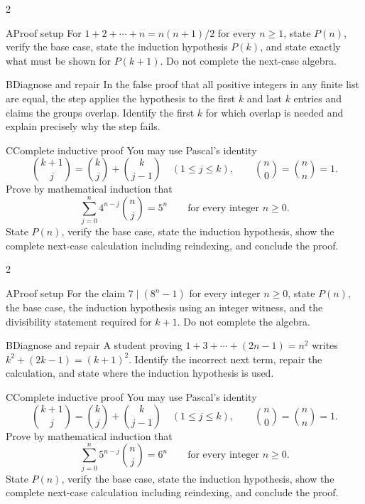 \documentclass[9pt]{extarticle}
\begin{document}
\CoreWorkArea
\FormBreak
{}
\begin{multicols}{2}
\begin{CompactCoreProblem}{A}{Proof setup}
For $1+2+\cdots+n=n(n+1)/2$ for every $n\ge1$, state $P(n)$, verify the base case, state the induction hypothesis $P(k)$, and state exactly what must be shown for $P(k+1)$. Do not complete the next-case algebra.
\end{CompactCoreProblem}
\begin{CompactCoreProblem}{B}{Diagnose and repair}
In the false proof that all positive integers in any finite list are equal, the step applies the hypothesis to the first $k$ and last $k$ entries and claims the groups overlap. Identify the first $k$ for which overlap is needed and explain precisely why the step fails.
\end{CompactCoreProblem}
\end{multicols}
\begin{CompactCoreProblem}{C}{Complete inductive proof}
You may use Pascal's identity
\[
\binom{k+1}{j}=\binom{k}{j}+\binom{k}{j-1}
\quad(1\le j\le k),\qquad
\binom{n}{0}=\binom{n}{n}=1.
\]
Prove by mathematical induction that
\[
\sum_{j=0}^{n} 4^{n-j}\binom{n}{j}=5^n\qquad\text{for every integer }n\ge0.
\]
State $P(n)$, verify the base case, state the induction hypothesis, show the complete next-case calculation including reindexing, and conclude the proof.
\end{CompactCoreProblem}
\CoreWorkArea
\FormBreak
{}
\begin{multicols}{2}
\begin{CompactCoreProblem}{A}{Proof setup}
For the claim $7\mid(8^n-1)$ for every integer $n\ge0$, state $P(n)$, the base case, the induction hypothesis using an integer witness, and the divisibility statement required for $k+1$. Do not complete the algebra.
\end{CompactCoreProblem}
\begin{CompactCoreProblem}{B}{Diagnose and repair}
A student proving $1+3+\cdots+(2n-1)=n^2$ writes $k^2+(2k-1)=(k+1)^2$. Identify the incorrect next term, repair the calculation, and state where the induction hypothesis is used.
\end{CompactCoreProblem}
\end{multicols}
\begin{CompactCoreProblem}{C}{Complete inductive proof}
You may use Pascal's identity
\[
\binom{k+1}{j}=\binom{k}{j}+\binom{k}{j-1}
\quad(1\le j\le k),\qquad
\binom{n}{0}=\binom{n}{n}=1.
\]
Prove by mathematical induction that
\[
\sum_{j=0}^{n} 5^{n-j}\binom{n}{j}=6^n\qquad\text{for every integer }n\ge0.
\]
State $P(n)$, verify the base case, state the induction hypothesis, show the complete next-case calculation including reindexing, and conclude the proof.
\end{CompactCoreProblem}
\end{document}
